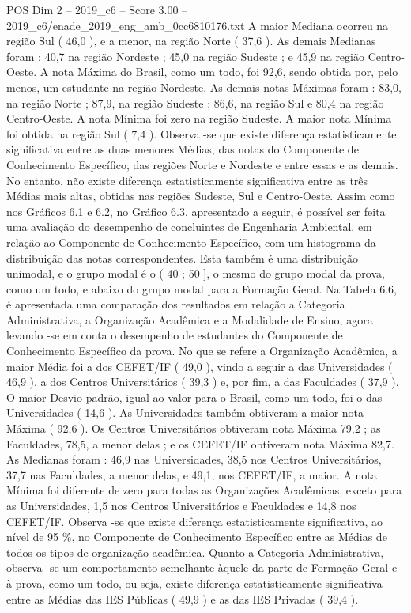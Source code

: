 \begin{textsample}{POS Dim 2 – 2019\_c6 – Score 3.00 – 2019\_c6/enade\_2019\_eng\_amb\_0cc6810176.txt}
A maior Mediana ocorreu na região Sul ( 46,0 ), e a menor, na região Norte ( 37,6 ).
As demais Medianas foram : 40,7 na região Nordeste ; 45,0 na região Sudeste ; e 45,9 na região Centro-Oeste.
A nota Máxima do Brasil, como um todo, foi 92,6, sendo obtida por, pelo menos, um estudante na região Nordeste.
As demais notas Máximas foram : 83,0, na região Norte ; 87,9, na região Sudeste ; 86,6, na região Sul e 80,4 na região Centro-Oeste.
A nota Mínima foi zero na região Sudeste.
A maior nota Mínima foi obtida na região Sul ( 7,4 ).
Observa -se que existe diferença estatisticamente significativa entre as duas menores Médias, das notas do Componente de Conhecimento Específico, das regiões Norte e Nordeste e entre essas e as demais.
No entanto, não existe diferença estatisticamente significativa entre as três Médias mais altas, obtidas nas regiões Sudeste, Sul e Centro-Oeste.
Assim como nos Gráficos 6.1 e 6.2, no Gráfico 6.3, apresentado a seguir, é possível ser feita uma avaliação do desempenho de concluintes de Engenharia Ambiental, em relação ao Componente de Conhecimento Específico, com um histograma da distribuição das notas correspondentes.
Esta também é uma distribuição unimodal, e o grupo modal é o ( 40 ; 50 ], o mesmo do grupo modal da prova, como um todo, e abaixo do grupo modal para a Formação Geral.
Na Tabela 6.6, é apresentada uma comparação dos resultados em relação a Categoria Administrativa, a Organização Acadêmica e a Modalidade de Ensino, agora levando -se em conta o desempenho de estudantes do Componente de Conhecimento Específico da prova.
No que se refere a Organização Acadêmica, a maior Média foi a dos CEFET/IF ( 49,0 ), vindo a seguir a das Universidades ( 46,9 ), a dos Centros Universitários ( 39,3 ) e, por fim, a das Faculdades ( 37,9 ).
O maior Desvio padrão, igual ao valor para o Brasil, como um todo, foi o das Universidades ( 14,6 ).
As Universidades também obtiveram a maior nota Máxima ( 92,6 ).
Os Centros Universitários obtiveram nota Máxima 79,2 ; as Faculdades, 78,5, a menor delas ; e os CEFET/IF obtiveram nota Máxima 82,7.
As Medianas foram : 46,9 nas Universidades, 38,5 nos Centros Universitários, 37,7 nas Faculdades, a menor delas, e 49,1, nos CEFET/IF, a maior.
A nota Mínima foi diferente de zero para todas as Organizações Acadêmicas, exceto para as Universidades, 1,5 nos Centros Universitários e Faculdades e 14,8 nos CEFET/IF.
Observa -se que existe diferença estatisticamente significativa, ao nível de 95 \%, no Componente de Conhecimento Específico entre as Médias de todos os tipos de organização acadêmica.
Quanto a Categoria Administrativa, observa -se um comportamento semelhante àquele da parte de Formação Geral e à prova, como um todo, ou seja, existe diferença estatisticamente significativa entre as Médias das IES Públicas ( 49,9 ) e as das IES Privadas ( 39,4 ).

\end{textsample}
